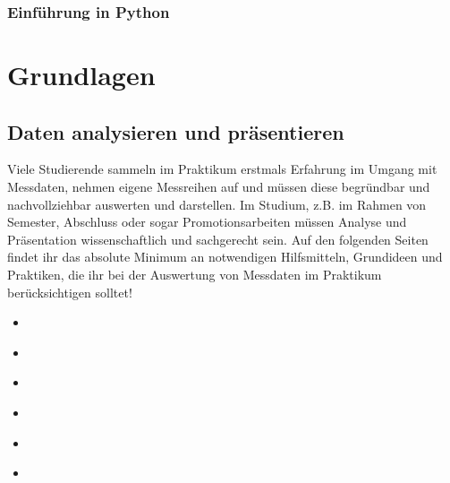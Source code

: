 \documentclass[letterpaper,10pt,english]{jupyterBook}
\begin{document}
\section{Einführung in Python}
\label{\detokenize{content/00_jupyter:einfuhrung-in-python}}
\sphinxstepscope


\part{Grundlagen}

\sphinxstepscope


\chapter{Daten analysieren und präsentieren}
\label{\detokenize{content/1_Datenanalyse:daten-analysieren-und-prasentieren}}\label{\detokenize{content/1_Datenanalyse::doc}}
\sphinxAtStartPar
Viele Studierende sammeln im Praktikum erstmals Erfahrung im Umgang mit Messdaten, nehmen eigene Messreihen auf und müssen diese begründbar und nachvollziehbar auswerten und darstellen. Im Studium, z.B. im Rahmen von Semester\sphinxhyphen{}, Abschluss\sphinxhyphen{} oder sogar Promotionsarbeiten müssen Analyse und Präsentation wissenschaftlich und sachgerecht sein. Auf den folgenden Seiten findet ihr das absolute Minimum an notwendigen Hilfsmitteln, Grundideen und Praktiken, die ihr bei der Auswertung von Messdaten im Praktikum berücksichtigen solltet!
\begin{itemize}
\item {} 
\sphinxAtStartPar
{\hyperref[\detokenize{content/1_Einleitung::doc}]{}}

\item {} 
\sphinxAtStartPar
{\hyperref[\detokenize{content/0_Basics::doc}]{}}

\item {} 
\sphinxAtStartPar
{\hyperref[\detokenize{content/1_Messunsicherheiten::doc}]{}}

\item {} 
\sphinxAtStartPar
{\hyperref[\detokenize{content/1_Mittelwert_StdAbw::doc}]{}}

\item {} 
\sphinxAtStartPar
{\hyperref[\detokenize{content/1_Fehlerfortpflanzung::doc}]{}}

\item {} 
\sphinxAtStartPar
{\hyperref[\detokenize{content/1_Kurvenanpassung::doc}]{}}

\end{itemize}
\end{document}
